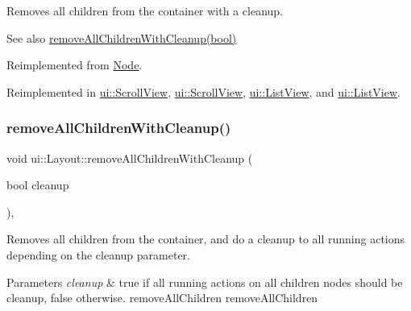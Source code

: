 Removes all children from the container with a cleanup.

\begin{DoxySeeAlso}{See also}
{\ttfamily \hyperlink{classui_1_1Layout_a7c317fa2fc294158776962b9218304b9}{remove\+All\+Children\+With\+Cleanup(bool)}} 
\end{DoxySeeAlso}


Reimplemented from \hyperlink{classNode_a0f6ef5518d2e5dd5be405e98b37ace4a}{Node}.



Reimplemented in \hyperlink{classui_1_1ScrollView_aa036ed1712c78c6ee701eb94eea55091}{ui\+::\+Scroll\+View}, \hyperlink{classui_1_1ScrollView_aaef2d3ce7b1b7d485af4a3657bea17e5}{ui\+::\+Scroll\+View}, \hyperlink{classui_1_1ListView_acfa88e95692c1e9713697fbd2754379b}{ui\+::\+List\+View}, and \hyperlink{classui_1_1ListView_a7e534825fe60406ed544a254b0975489}{ui\+::\+List\+View}.

\mbox{\label{classui_1_1Layout_a7c317fa2fc294158776962b9218304b9}} 
\subsubsection{\texorpdfstring{remove\+All\+Children\+With\+Cleanup()}{removeAllChildrenWithCleanup()}\hspace{0.1cm}{\footnotesize\ttfamily [1/2]}}
{\footnotesize\ttfamily void ui\+::\+Layout\+::remove\+All\+Children\+With\+Cleanup (\begin{DoxyParamCaption}\item[{bool}]{cleanup }\end{DoxyParamCaption})\hspace{0.3cm}{\ttfamily [override]}, {\ttfamily [virtual]}}

Removes all children from the container, and do a cleanup to all running actions depending on the cleanup parameter.


\begin{DoxyParams}{Parameters}
{\em cleanup} & true if all running actions on all children nodes should be cleanup, false otherwise.  remove\+All\+Children  remove\+All\+Children \\
\hline
\end{DoxyParams}


